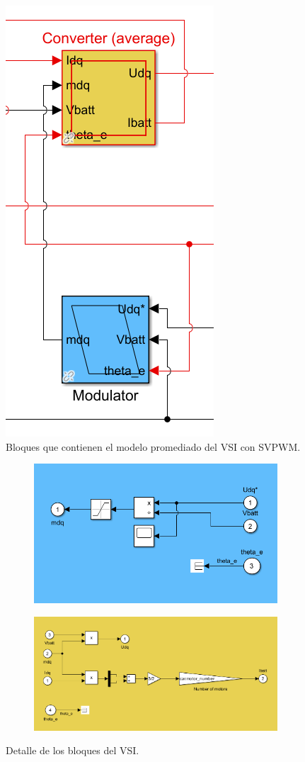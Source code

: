 \begin{figure}[H]
    \centering
    \includegraphics[width=0.25\linewidth]{fig/VSIEMR_out.png}
    \caption{Bloques que contienen el modelo promediado del VSI con SVPWM.}

\end{figure}

\begin{figure}[H]
    \centering
    \begin{subfigure}{0.45\linewidth}
        \centering
        \includegraphics[width=\linewidth]{fig/VSIEMR_in1.png}
    \end{subfigure}
    \begin{subfigure}{0.45\linewidth}
        \centering
        \includegraphics[width=\linewidth]{fig/VSIEMR_in2.png}
    \end{subfigure}
    \caption{Detalle de los bloques del VSI.}

\end{figure}

